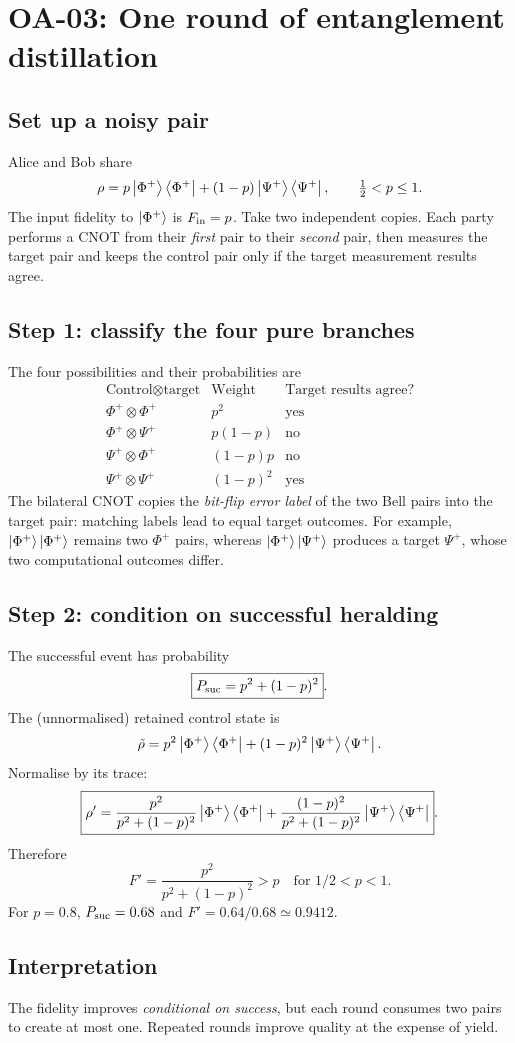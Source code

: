 
\section{OA-03: One round of entanglement distillation}
\subsection*{Set up a noisy pair}
Alice and Bob share
\[
\rho=p\left\lvert \Phi^+\right\rangle\left\langle \Phi^+\right\rvert
+(1-p)\left\lvert \Psi^+\right\rangle\left\langle \Psi^+\right\rvert,
\qquad \tfrac12<p\le1 .
\]
The input fidelity to \(\left\lvert \Phi^+\right\rangle\) is \(F_{\rm in}=p\).
Take two independent copies. Each party performs a CNOT
from their \emph{first} pair to their \emph{second} pair,
then measures the target pair and keeps the control pair
only if the target measurement results agree.

\subsection*{Step 1: classify the four pure branches}
The four possibilities and their probabilities are
\[
\begin{array}{c|c|c}
\text{Control}\otimes\text{target}&\text{Weight}&
\text{Target results agree?}\\\hline
\Phi^+\otimes\Phi^+&p^2&\text{yes}\\
\Phi^+\otimes\Psi^+&p(1-p)&\text{no}\\
\Psi^+\otimes\Phi^+&(1-p)p&\text{no}\\
\Psi^+\otimes\Psi^+&(1-p)^2&\text{yes}
\end{array}
\]
The bilateral CNOT copies the \emph{bit-flip error label}
of the two Bell pairs into the target pair: matching labels
lead to equal target outcomes. For example,
\(\left\lvert \Phi^+\right\rangle\left\lvert \Phi^+\right\rangle\) remains two \(\Phi^+\) pairs,
whereas \(\left\lvert \Phi^+\right\rangle\left\lvert \Psi^+\right\rangle\) produces a target
\(\Psi^+\), whose two computational outcomes differ.

\subsection*{Step 2: condition on successful heralding}
The successful event has probability
\[
\boxed{P_{\rm suc}=p^2+(1-p)^2}.
\]
The (unnormalised) retained control state is
\[
\tilde\rho=p^2\left\lvert \Phi^+\right\rangle\left\langle \Phi^+\right\rvert
+(1-p)^2\left\lvert \Psi^+\right\rangle\left\langle \Psi^+\right\rvert.
\]
Normalise by its trace:
\[
\boxed{\rho'=
\frac{p^2}{p^2+(1-p)^2}\left\lvert \Phi^+\right\rangle\left\langle \Phi^+\right\rvert
+\frac{(1-p)^2}{p^2+(1-p)^2}\left\lvert \Psi^+\right\rangle\left\langle \Psi^+\right\rvert}.
\]
Therefore
\[
\boxed{F'=\frac{p^2}{p^2+(1-p)^2}>p
\quad\text{for }1/2<p<1}.
\]
For \(p=0.8\), \(P_{\rm suc}=0.68\) and
\(F'=0.64/0.68\simeq0.9412\).

\subsection*{Interpretation}
The fidelity improves \emph{conditional on success}, but
each round consumes two pairs to create at most one.
Repeated rounds improve quality at the expense of yield.
